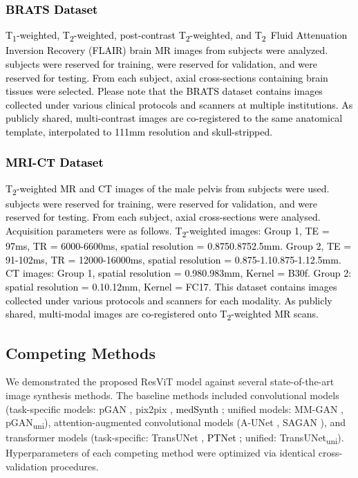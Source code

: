 \documentclass[journal,twoside,web]{ieeecolor}
\newcommand{\Tone}{T\textsubscript{1}}
\newcommand{\Ttwo}{T\textsubscript{2}}
\newcommand*{\revhl}{\textcolor{black}}
\begin{document}
\subsubsection{\revhl{BRATS Dataset}} \revhl{\Tone-weighted, \Ttwo-weighted, post-contrast \Ttwo-weighted, and \Ttwo~Fluid Attenuation Inversion Recovery (FLAIR) brain MR images from  subjects were analyzed.  subjects were reserved for training,  were reserved for validation, and  were reserved for testing. From each subject,  axial cross-sections containing brain tissues were selected. Please note that the BRATS dataset contains images collected under various clinical protocols and scanners at multiple institutions. As publicly shared, multi-contrast images are co-registered to the same anatomical template, interpolated to 111mm resolution and skull-stripped.}

\subsubsection{\revhl{MRI-CT Dataset}}
\revhl{\Ttwo-weighted MR and CT images of the male pelvis from  subjects were used.  subjects were reserved for training,  were reserved for validation, and  were reserved for testing. From each subject,  axial cross-sections were analysed. Acquisition parameters were as follows. \Ttwo-weighted images: Group 1, TE = 97ms, TR = 6000-6600ms, spatial resolution = 0.8750.8752.5mm. Group 2, TE = 91-102ms, TR = 12000-16000ms, spatial resolution = 0.875-1.10.875-1.12.5mm. CT images: Group 1, spatial resolution = 0.980.983mm, Kernel = B30f. Group 2: spatial resolution = 0.10.12mm, Kernel = FC17. This dataset contains images collected under various protocols and scanners for each modality. As publicly shared, multi-modal images are co-registered onto \Ttwo-weighted MR scans.}



\vspace{-4mm}
\subsection{Competing Methods}
We demonstrated the proposed ResViT model against several state-of-the-art image synthesis methods. The baseline methods included convolutional models (task-specific models: pGAN \cite{pgan}, pix2pix \cite{pix2pix}, \revhl{medSynth \cite{nie2018}}; unified models: MM-GAN \cite{mmgan}, pGAN\textsubscript{uni}), attention-augmented convolutional models (A-UNet \cite{attention_unet}, SAGAN \cite{sagan}), and transformer models (task-specific: TransUNet \cite{trans_unet}, \revhl{PTNet \cite{ptnet};} unified: TransUNet\textsubscript{uni}). Hyperparameters of each competing method were optimized via identical cross-validation procedures.
\end{document}
